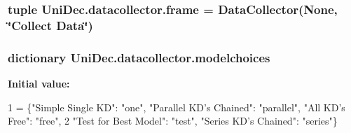 \subsubsection[{frame}]{\setlength{\rightskip}{0pt plus 5cm}tuple Uni\+Dec.\+datacollector.\+frame = {\bf Data\+Collector}(None, \char`\"{}Collect Data\char`\"{})}\label{namespace_uni_dec_1_1datacollector_aec857f9315b3a9f7c5e344eb0fbdbf16}
\hypertarget{namespace_uni_dec_1_1datacollector_a3374d5aee476c8e1ce9042c14b94273d}{}
\subsubsection[{modelchoices}]{\setlength{\rightskip}{0pt plus 5cm}dictionary Uni\+Dec.\+datacollector.\+modelchoices}\label{namespace_uni_dec_1_1datacollector_a3374d5aee476c8e1ce9042c14b94273d}
{\bfseries Initial value\+:}
\begin{DoxyCode}
1 = \{\textcolor{stringliteral}{"Simple Single KD"}: \textcolor{stringliteral}{"one"}, \textcolor{stringliteral}{"Parallel KD's Chained"}: \textcolor{stringliteral}{"parallel"}, \textcolor{stringliteral}{"All KD's Free"}: \textcolor{stringliteral}{"free"},
2                 \textcolor{stringliteral}{"Test for Best Model"}: \textcolor{stringliteral}{"test"}, \textcolor{stringliteral}{"Series KD's Chained"}: \textcolor{stringliteral}{"series"}\}
\end{DoxyCode}

